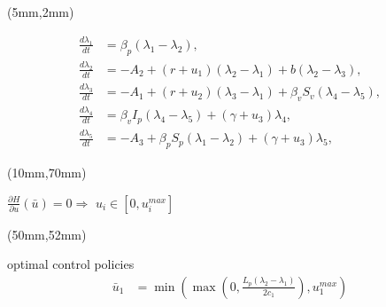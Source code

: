 \begin{frame}[plain]
    \begin{textblock*}{80mm}(5mm,2mm)
        \begin{greenbox}{}
            \begin{align*}
                \frac{d\lambda_1}{dt} 
                    &=
                    \beta_p (\lambda_1-\lambda_2),
                \\
                \frac{d\lambda_2}{dt} 
                    &=-A_2+(r+u_1)(\lambda_2-\lambda_1)
                    +b (\lambda_2-\lambda_3),
                \\
                \frac{d\lambda_3}{dt} 
                    &=
                    - A_1 + (r+u_2)(\lambda_3-\lambda_1)
                     + \beta_v S_v (\lambda_4-\lambda_5),
                \\
                \frac{d\lambda_4}{dt} 
                    &=
                    \beta_v I_p (\lambda_4-\lambda_5)
                    + (\gamma+u_3) \lambda_4,
                \\
                \frac{d\lambda_5}{dt} 
                    &=
                    -A_3+\beta_p  S_p(\lambda_1-\lambda_2)
                    + (\gamma+u_3)\lambda_5,
            \end{align*}
        \end{greenbox}
    \end{textblock*}
%
    \begin{textblock*}{32mm}(10mm,70mm)
        \begin{yellowbox}{}
            $\frac{\partial H}{\partial u}(\bar{u})=0 
            \Rightarrow$
            \tcblower
            $
                u_i \in 
                [0, u_i^{max}]
            $
        \end{yellowbox}
    \end{textblock*}
%
    \begin{textblock*}{70mm}(50mm,52mm)
        \begin{yellowbox}{optimal control policies}
            \begin{align*}
                \bar{u}_1
                    &=
                    \min
                        \left(
                            \max
                                \left(
                                    0,
                                    \frac{L_p(\lambda_2-\lambda_1)}{2c_1}
                                \right),
                            u_1^{max}
                        \right)
                \\

\end{align*}
\end{yellowbox}
\end{textblock*}
\end{frame}

